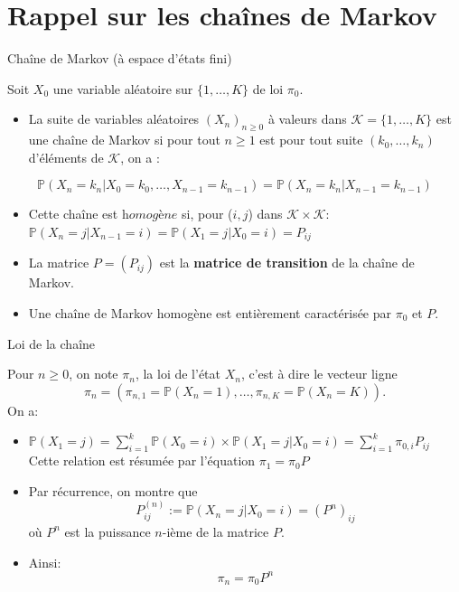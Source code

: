 \documentclass[9pt,ignorenonframetext,]{beamer}
\providecommand{\tightlist}{%
  \setlength{\itemsep}{0pt}\setlength{\parskip}{0pt}}
\newcommand{\Pro}{\mathbb{P}}
\newcommand{\K}{\mathcal{K}}
\begin{document}
\hypertarget{rappel-sur-les-chauxeenes-de-markov}{%
\section{Rappel sur les chaînes de
Markov}\label{rappel-sur-les-chauxeenes-de-markov}}

\begin{frame}{Chaîne de Markov (à espace d'états fini)}
\protect\hypertarget{chauxeene-de-markov-uxe0-espace-duxe9tats-fini}{}

Soit \(X_0\) une variable aléatoire sur \(\lbrace 1,\dots, K\rbrace\) de
loi \(\pi_0\).

\begin{itemize}
\tightlist
\item
  La suite de variables aléatoires \((X_n)_{n\geq 0}\) à valeurs dans
  \(\K =\lbrace 1,\dots, K\rbrace\) est une chaîne de Markov si pour
  tout \(n\geq 1\) est pour tout suite \((k_0,\dots,k_n)\) d'éléments de
  \(\K\), on a :
\end{itemize}

\[\mathbb{P}\left( X_n = k_n \vert X_0 = k_0,\dots,X_{n- 1} = k_{n- 1}\right) = \mathbb{P}(X_n = k_n \vert X_{n-1} = k_{n-1})\]

\begin{itemize}
\tightlist
\item
  Cette chaîne est \(\textit{homogène}\) si, pour (\(i, j\)) dans
  \(\K \times \K\):
  \(\mathbb{P}(X_n = j \vert X_{n-1} = i) = \mathbb{P}(X_1 = j \vert X_{0} = i) = P_{ij}\)
\item
  La matrice \(P = (P_{ij})\) est la \textbf{matrice de transition} de
  la chaîne de Markov.
\item
  Une chaîne de Markov homogène est entièrement caractérisée par
  \(\pi_0\) et \(P\).
\end{itemize}

\end{frame}

\begin{frame}{Loi de la chaîne}
\protect\hypertarget{loi-de-la-chauxeene}{}

Pour \(n \geq 0\), on note \(\pi_n\), la loi de l'état \(X_n\), c'est à
dire le vecteur ligne
\[\pi_n = (\pi_{n,1} = \Pro(X_n = 1),\dots,\pi_{n, K} = \Pro(X_n = K)).\]
On a:

\begin{itemize}
\tightlist
\item
  \(\Pro(X_1 = j) = \sum_{i = 1}^k \Pro(X_0 = i) \times \Pro(X_1 = j \vert X_0 = i) = \sum_{i = 1}^k \pi_{0,i}P_{ij}\)
  Cette relation est résumée par l'équation \(\pi_1 = \pi_0P\)
\item
  Par récurrence, on montre que
  \[P^{(n)}_{ij} := \Pro(X_n = j\vert X_0 = i) = (P^n)_{ij}\] où \(P^n\)
  est la puissance \(n\)-ième de la matrice \(P\).
\item
  Ainsi: \[\pi_n = \pi_0P^n\]
\end{itemize}

\end{frame}
\end{document}
